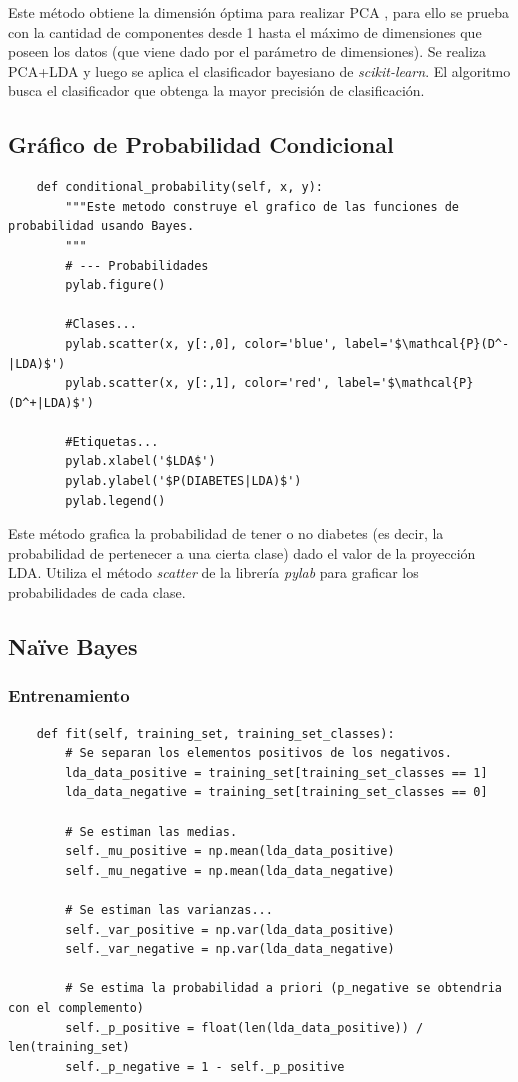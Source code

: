 \documentclass[letter, titlepage, 10pt]{article}
\begin{document}
Este método obtiene la dimensión óptima para realizar PCA , para ello se prueba con la cantidad de componentes desde 1 hasta el máximo de dimensiones que poseen los datos (que viene dado por el parámetro de dimensiones). Se realiza PCA+LDA y luego se aplica el clasificador bayesiano de \textit{scikit-learn}. El algoritmo busca el clasificador que obtenga la mayor precisión de clasificación.

\subsection{Gráfico de Probabilidad Condicional}
\begin{lstlisting} 
    def conditional_probability(self, x, y):
        """Este metodo construye el grafico de las funciones de probabilidad usando Bayes.
        """
        # --- Probabilidades
        pylab.figure()
        
        #Clases...
        pylab.scatter(x, y[:,0], color='blue', label='$\mathcal{P}(D^-|LDA)$')
        pylab.scatter(x, y[:,1], color='red', label='$\mathcal{P}(D^+|LDA)$')
        
        #Etiquetas...
        pylab.xlabel('$LDA$')
        pylab.ylabel('$P(DIABETES|LDA)$')
        pylab.legend()
\end{lstlisting}
Este método grafica la probabilidad de tener o no diabetes (es decir, la probabilidad de pertenecer a una cierta clase) dado el valor de la proyección LDA. Utiliza el método \textit{scatter} de la librería \textit{pylab} para graficar los probabilidades de cada clase.

\subsection{Naïve Bayes}
\subsubsection{Entrenamiento}
\begin{lstlisting}
    def fit(self, training_set, training_set_classes):
        # Se separan los elementos positivos de los negativos.
        lda_data_positive = training_set[training_set_classes == 1]
        lda_data_negative = training_set[training_set_classes == 0]

        # Se estiman las medias.
        self._mu_positive = np.mean(lda_data_positive)
        self._mu_negative = np.mean(lda_data_negative)

        # Se estiman las varianzas...
        self._var_positive = np.var(lda_data_positive)
        self._var_negative = np.var(lda_data_negative)

        # Se estima la probabilidad a priori (p_negative se obtendria con el complemento)
        self._p_positive = float(len(lda_data_positive)) / len(training_set)
        self._p_negative = 1 - self._p_positive
\end{lstlisting}
\end{document}

